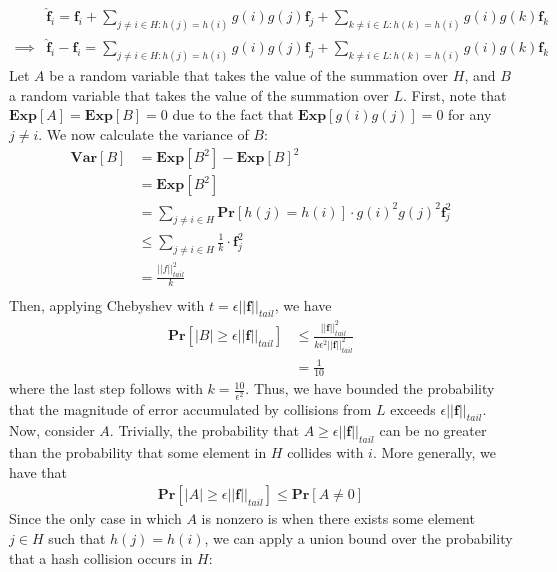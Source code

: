 \documentclass[12pt]{article}
\begin{document}
\begin{solution}
\begin{align*}
        &\hat{\textbf{f}}_i = \textbf{f}_i + \sum\limits_{j \neq i \in H: h(j) = h(i)} g(i)g(j)\textbf{f}_j + \sum\limits_{k \neq i \in L: h(k) = h(i)} g(i)g(k)\textbf{f}_k \\
        \implies &\hat{\textbf{f}}_i - \textbf{f}_i = \sum\limits_{j \neq i \in H: h(j) = h(i)} g(i)g(j)\textbf{f}_j + \sum\limits_{k \neq i \in L: h(k) = h(i)} g(i)g(k)\textbf{f}_k
    \end{align*}
    Let $A$ be a random variable that takes the value of the summation over $H$, and $B$ a random variable that takes the value of the summation over $L$. First, note that $\textbf{Exp}[A] = \textbf{Exp}[B] = 0$ due to the fact that $\textbf{Exp}[g(i)g(j)] = 0$ for any $j \neq i$. We now calculate the variance of $B$:
    \begin{align*}
        \textbf{Var}[B] &= \textbf{Exp}[B^2] - \textbf{Exp}[B]^2 \\
        &= \textbf{Exp}[B^2] \\
        &= \sum\limits_{j \neq i \in H} \textbf{Pr}[h(j) = h(i)] \cdot g(i)^2g(j)^2\textbf{f}_j^2 \\
        &\leq \sum\limits_{j \neq i \in H} \frac{1}{k} \cdot \textbf{f}_j^2 \\
        &= \frac{||f||_{tail}^2}{k} \\ 
    \end{align*}
    Then, applying Chebyshev with $t = \epsilon ||\textbf{f}||_{tail}$, we have
    \begin{align*}
        \textbf{Pr}[|B| \geq \epsilon ||\textbf{f}||_{tail}] &\leq \frac{||\textbf{f}||_{tail}^2}{k\epsilon^2||\textbf{f}||_{tail}^2} \\
        &= \frac{1}{10}
    \end{align*}
    where the last step follows with $k = \frac{10}{\epsilon^2}$. Thus, we have bounded the probability that the magnitude of error accumulated by collisions from $L$ exceeds $\epsilon||\textbf{f}||_{tail}$. Now, consider $A$. Trivially, the probability that $A \geq \epsilon ||\textbf{f}||_{tail}$ can be no greater than the probability that some element in $H$ collides with $i$. More generally, we have that
    \begin{align*}
        \textbf{Pr}[|A| \geq \epsilon||\textbf{f}||_{tail}] \leq \textbf{Pr}[A \neq 0]
    \end{align*}
    Since the only case in which $A$ is nonzero is when there exists some element $j \in H$ such that $h(j) = h(i)$, we can apply a union bound over the probability that a hash collision occurs in $H$:

\end{solution}
\end{document}
